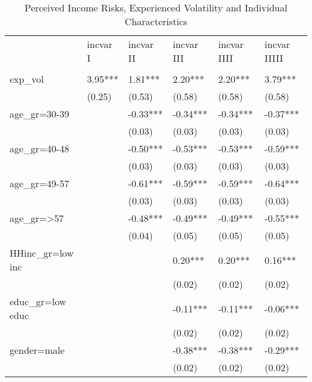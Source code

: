 \begin{table}[p]
\centering
\begin{adjustbox}{width=\textwidth}
\begin{threeparttable}
\caption{Perceived Income Risks, Experienced Volatility and Individual Characteristics}
\label{micro_reg}\begin{tabular}{llllll}
\toprule
{} & incvar I & incvar II & incvar III & incvar IIII & incvar IIIII \\
                 &          &           &            &             &              \\
\midrule
exp\_vol          &  3.95*** &   1.81*** &    2.20*** &     2.20*** &      3.79*** \\
                 &   (0.25) &    (0.53) &     (0.58) &      (0.58) &       (0.58) \\
age\_gr=30-39     &          &  -0.33*** &   -0.34*** &    -0.34*** &     -0.37*** \\
                 &          &    (0.03) &     (0.03) &      (0.03) &       (0.03) \\
age\_gr=40-48     &          &  -0.50*** &   -0.53*** &    -0.53*** &     -0.59*** \\
                 &          &    (0.03) &     (0.03) &      (0.03) &       (0.03) \\
age\_gr=49-57     &          &  -0.61*** &   -0.59*** &    -0.59*** &     -0.64*** \\
                 &          &    (0.03) &     (0.03) &      (0.03) &       (0.03) \\
age\_gr=>57       &          &  -0.48*** &   -0.49*** &    -0.49*** &     -0.55*** \\
                 &          &    (0.04) &     (0.05) &      (0.05) &       (0.05) \\
HHinc\_gr=low inc &          &           &    0.20*** &     0.20*** &      0.16*** \\
                 &          &           &     (0.02) &      (0.02) &       (0.02) \\
educ\_gr=low educ &          &           &   -0.11*** &    -0.11*** &     -0.06*** \\
                 &          &           &     (0.02) &      (0.02) &       (0.02) \\
gender=male      &          &           &   -0.38*** &    -0.38*** &     -0.29*** \\
                 &          &           &     (0.02) &      (0.02) &       (0.02) \\

\end{tabular}
\end{threeparttable}
\end{adjustbox}
\end{table}
